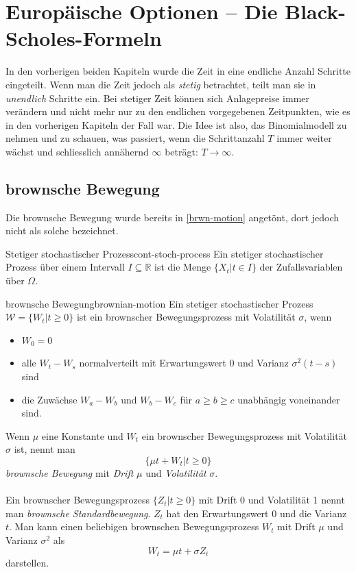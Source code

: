\documentclass[11pt]{report} %
\begin{document}
\chapter{Europäische Optionen -- Die Black-Scholes-Formeln}
In den vorherigen beiden Kapiteln wurde die Zeit in eine endliche Anzahl Schritte eingeteilt. Wenn man die Zeit jedoch als \textit{stetig} betrachtet, teilt man sie in \textit{unendlich} Schritte ein. Bei stetiger Zeit können sich Anlagepreise immer verändern und nicht mehr nur zu den endlichen vorgegebenen Zeitpunkten, wie es in den vorherigen Kapiteln der Fall war. Die Idee ist also, das Binomialmodell zu nehmen und zu schauen, was passiert, wenn die Schrittanzahl $T$ immer weiter wächst und schliesslich annähernd $\infty$ beträgt: $T \rightarrow \infty$.
\section{brownsche Bewegung}
Die brownsche Bewegung wurde bereits in \ref{brwn-motion} angetönt, dort jedoch nicht als solche bezeichnet.
\begin{Definition}{Stetiger stochastischer Prozess}{cont-stoch-process}
    Ein stetiger stochastischer Prozess über einem Intervall $I\subseteq \mathbb{R}$ ist die Menge $\{X_t|t\in I\}$ der Zufallsvariablen über $\Omega$. 
\end{Definition}
\begin{Definition}{brownsche Bewegung}{brownian-motion}
    Ein stetiger stochastischer Prozess $\mathcal{W}=\{W_t|t\geq0\}$ ist ein brownscher Bewegungsprozess mit Volatilität $\sigma$, wenn
    \begin{itemize}
        \item $W_0=0$
        \item alle $W_t-W_s$ normalverteilt mit Erwartungswert 0 und Varianz $\sigma^2(t-s)$ sind
        \item die Zuwächse $W_a-W_b$ und $W_b-W_c$ für $a\geq b \geq c$ unabhängig voneinander sind.
    \end{itemize}
    Wenn $\mu$ eine Konstante und $W_t$ ein brownscher Bewegungsprozess mit Volatilität $\sigma$ ist, nennt man $$\{\mu t + W_t|t\geq 0\}$$ \textit{brownsche Bewegung} mit \textit{Drift} $\mu$ und \textit{Volatilität} $\sigma$.\\\\
    Ein brownscher Bewegungsprozess $\{Z_t|t\geq 0\}$ mit Drift 0 und Volatilität 1 nennt man \textit{brownsche Standardbewegung}. $Z_t$ hat den Erwartungswert 0 und die Varianz $t$. Man kann einen beliebigen brownschen Bewegungsprozess $W_t$ mit Drift $\mu$ und Varianz $\sigma^2$ als $$W_t=\mu t + \sigma Z_t$$ darstellen.
\end{Definition}
\end{document}
